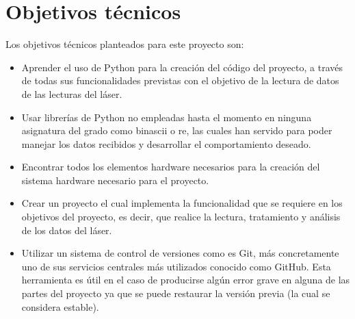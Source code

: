 \section{Objetivos técnicos}

Los objetivos técnicos planteados para este proyecto son:
\begin{itemize}
	\item Aprender el uso de Python para la creación del código del proyecto, a través de todas sus funcionalidades previstas con el objetivo de la lectura de datos de las lecturas del láser.
	\item Usar librerías de Python no empleadas hasta el momento en ninguna asignatura del grado como binascii o re, las cuales han servido para poder manejar los datos recibidos y desarrollar el comportamiento deseado.
	\item Encontrar todos los elementos hardware necesarios para la creación del sistema hardware necesario para el proyecto.
	\item Crear un proyecto el cual implementa la funcionalidad que se requiere en los objetivos del proyecto, es decir, que realice la lectura, tratamiento y análisis de los datos del láser.
	\item Utilizar un sistema de control de versiones como es Git, más concretamente uno de sus servicios centrales más utilizados conocido como GitHub. Esta herramienta es útil en el caso de producirse algún error grave en alguna de las partes del proyecto ya que se puede restaurar la versión previa (la cual se considera estable).
\end{itemize}

